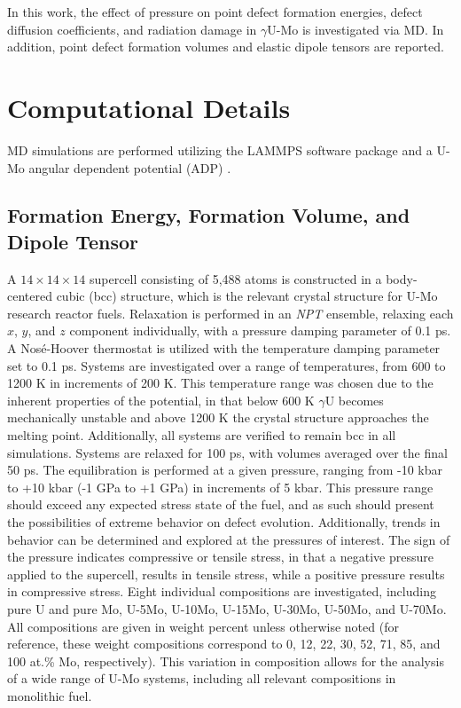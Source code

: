 \documentclass[review]{elsarticle}
\begin{document}
In this work, the effect of pressure on point defect formation energies, defect diffusion coefficients, and radiation damage in $\gamma$U-Mo is investigated via MD. In addition, point defect formation volumes and elastic dipole tensors are reported.

\section{Computational Details}\label{sec2}

MD simulations are performed utilizing the LAMMPS \cite{plimpton1995} software package and a U-Mo angular dependent potential (ADP) \cite{starikov2018,beelerumoxe}. 

\subsection{Formation Energy, Formation Volume, and Dipole Tensor}

A $14 \times 14 \times 14$ supercell consisting of 5,488 atoms is constructed in a body-centered cubic (bcc) structure, which is the relevant crystal structure for U-Mo research reactor fuels. Relaxation is performed in an \textit{NPT} ensemble, relaxing each $x$, $y$, and $z$ component individually, with a pressure damping parameter of 0.1 ps. A Nos\'e-Hoover thermostat is utilized with the temperature damping parameter set to 0.1 ps. Systems are investigated over a range of temperatures, from 600 to 1200 K in increments of 200 K. This temperature range was chosen due to the inherent properties of the potential, in that below 600 K $\gamma$U becomes mechanically unstable and above 1200 K the crystal structure approaches the melting point. Additionally, all systems are verified to remain bcc in all simulations. Systems are relaxed for 100 ps, with volumes averaged over the final 50 ps. The equilibration is performed at a given pressure, ranging from -10 kbar to +10 kbar (-1 GPa to +1 GPa) in increments of 5 kbar. This pressure range should exceed any expected stress state of the fuel, and as such should present the possibilities of extreme behavior on defect evolution. Additionally, trends in behavior can be determined and explored at the pressures of interest. The sign of the pressure indicates compressive or tensile stress, in that a negative pressure applied to the supercell, results in tensile stress, while a positive pressure results in compressive stress. Eight individual compositions are investigated, including pure U and pure Mo, U-5Mo, U-10Mo, U-15Mo, U-30Mo, U-50Mo, and U-70Mo. All compositions are given in weight percent unless otherwise noted (for reference, these weight compositions correspond to 0, 12, 22, 30, 52, 71, 85, and 100 at.\% Mo, respectively). This variation in composition allows for the analysis of a wide range of U-Mo systems, including all relevant compositions in monolithic fuel.  
\end{document}
